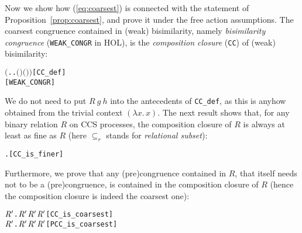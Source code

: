 Now we show how (\ref{eq:coarsest}) is connected with
the statement of Proposition~\ref{prop:coarsest}, and prove it under
the free action assumptions.
%
The coarsest congruence
contained in (weak) bisimilarity, namely \emph{bisimilarity
  congruence} (\texttt{WEAK_CONGR} in HOL), is
the \emph{composition closure} (\texttt{CC}) of (weak) bisimilarity:
\begin{alltt}
     \HOLTokenDefEquality{} \ensuremath{(}\HOLTokenLambda{} . \HOLSymConst{\HOLTokenForall{}}.   \HOLSymConst{\HOLTokenImp{}}  \ensuremath{(} \ensuremath{)} \ensuremath{(} \ensuremath{)}\ensuremath{)}\hfill{[CC_def]}
    \HOLTokenDefEquality{}  \hfill{[WEAK_CONGR]}
\end{alltt}
We do not need to put $R\ g\ h$ into the antecedents of
  \texttt{CC\_def}, as this is anyhow obtained from the trivial context $(\lambda x.\,x)$.
The next result shows that, for any binary relation $R$ 
on CCS processes, the composition closure of $R$ is always at least as
fine as $R$ (here $\subseteq_r$ stands for \emph{relational subset}):
\begin{alltt}
\HOLTokenTurnstile{} \HOLSymConst{\HOLTokenForall{}}.   \HOLSymConst{\HOLTokenRSubset{}} \hfill{[CC_is_finer]}
\end{alltt}
Furthermore, we prove that any (pre)congruence contained in $R$,
that itself needs not to be a (pre)congruence,
is contained in the composition closure of $R$
(hence the composition closure is indeed the coarsest one):
\begin{alltt}
\HOLTokenTurnstile{} \HOLSymConst{\HOLTokenForall{}} \ensuremath{\HOLBoundVar{R}\sp{\prime{}}}.  \ensuremath{\HOLBoundVar{R}\sp{\prime{}}} \HOLSymConst{\HOLTokenConj{}} \ensuremath{\HOLBoundVar{R}\sp{\prime{}}} \HOLSymConst{\HOLTokenRSubset{}}  \HOLSymConst{\HOLTokenImp{}} \ensuremath{\HOLBoundVar{R}\sp{\prime{}}} \HOLSymConst{\HOLTokenRSubset{}}  \hfill{[CC_is_coarsest]}
\HOLTokenTurnstile{} \HOLSymConst{\HOLTokenForall{}} \ensuremath{\HOLBoundVar{R}\sp{\prime{}}}.  \ensuremath{\HOLBoundVar{R}\sp{\prime{}}} \HOLSymConst{\HOLTokenConj{}} \ensuremath{\HOLBoundVar{R}\sp{\prime{}}} \HOLSymConst{\HOLTokenRSubset{}}  \HOLSymConst{\HOLTokenImp{}} \ensuremath{\HOLBoundVar{R}\sp{\prime{}}} \HOLSymConst{\HOLTokenRSubset{}}  \hfill{[PCC_is_coarsest]}
\end{alltt}

